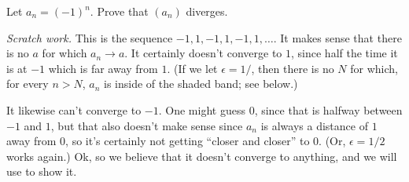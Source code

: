 \begin{example}
  Let $a_n = (-1)^n$. Prove that $(a_n)$ diverges.

  \textit{Scratch work.} This is the sequence $-1, 1, -1, 1, -1, 1,
  \dots$. It makes sense that there is no $a$ for which $a_n \to a$.
  It certainly doesn't converge to $1$, since half the time it is at
  $-1$ which is far away from $1$. (If we let $\epsilon = 1/$, then
    there is no $N$ for which, for every $n > N$, $a_n$ is inside of
  the shaded band; see below.)
  \begin{tightfigure}
    \centering
  \end{tightfigure}
  It likewise can't converge to $-1$. One might guess $0$, since that
  is halfway between $-1$ and $1$, but that also doesn't make sense
  since $a_n$ is always a distance of $1$ away from $0$, so it's
  certainly not getting ``closer and closer'' to $0$. (Or, $\epsilon
  = 1/2$ works again.) Ok, so we believe that it doesn't converge to
  anything, and we will use  to show it.


\end{example}
